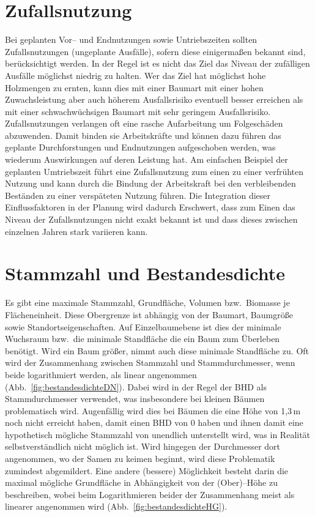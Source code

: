\documentclass[twocolumn]{scrartcl}
\begin{document}
\section{Zufallsnutzung}

Bei geplanten Vor-- und Endnutzungen sowie Untriebszeiten sollten
Zufallsnutzungen (ungeplante Ausfälle), sofern diese einigermaßen bekannt sind,
berücksichtigt werden. In der Regel ist es nicht das Ziel das Niveau der
zufälligen Ausfälle möglichst niedrig zu halten. Wer das Ziel hat möglichst hohe
Holzmengen zu ernten, kann dies mit einer Baumart mit einer hohen
Zuwachsleistung aber auch höherem Ausfallsrisiko eventuell besser erreichen als
mit einer schwachwüchsigen Baumart mit sehr geringem Ausfallsrisiko.
Zufallsnutzungen verlangen oft eine rasche Aufarbeitung um Folgeschäden
abzuwenden. Damit binden sie Arbeitskräfte und können dazu führen das geplante
Durchforstungen und Endnutzungen aufgeschoben werden, was wiederum Auswirkungen
auf deren Leistung hat. Am einfachen Beispiel der geplanten Umtriebszeit führt
eine Zufallsnutzung zum einen zu einer verfrühten Nutzung und kann durch die
Bindung der Arbeitskraft bei den verbleibenden Beständen zu einer verspäteten
Nutzung führen. Die Integration dieser Einflussfaktoren in der Planung wird
dadurch Erschwert, dass zum Einen das Niveau der Zufallsnutzungen nicht exakt
bekannt ist und dass dieses zwischen einzelnen Jahren stark variieren kann.

\section{Stammzahl und Bestandesdichte}

Es gibt eine maximale Stammzahl, Grundfläche, Volumen bzw.\ Biomasse je
Flächeneinheit. Diese Obergrenze ist abhängig von der Baumart, Baumgröße sowie
Standortseigenschaften. Auf Einzelbaumebene ist dies der minimale Wuchsraum
bzw.\ die minimale Standfläche die ein Baum zum Überleben benötigt. Wird ein
Baum größer, nimmt auch diese minimale Standfläche zu. Oft wird der Zusammenhang
zwischen Stammzahl und Stammdurchmesser, wenn beide logarithmiert werden, als
linear angenommen (Abb.~\ref{fig:bestandesdichteDN}). Dabei wird in der Regel
der BHD als Stammdurchmesser verwendet, was insbesondere bei kleinen Bäumen
problematisch wird. Augenfällig wird dies bei Bäumen die eine Höhe von 1,3\,m
noch nicht erreicht haben, damit einen BHD von 0 haben und ihnen damit eine
hypothetisch mögliche Stammzahl von unendlich unterstellt wird, was in Realität
selbstverständlich nicht möglich ist. Wird hingegen der Durchmesser dort
angenommen, wo der Samen zu keimen beginnt, wird diese Problematik zumindest
abgemildert. Eine andere (bessere) Möglichkeit besteht darin die maximal
mögliche Grundfläche in Abhängigkeit von der (Ober)--Höhe zu beschreiben, wobei
beim Logarithmieren beider der Zusammenhang meist als linearer angenommen wird
(Abb.~\ref{fig:bestandesdichteHG}).
\end{document}
